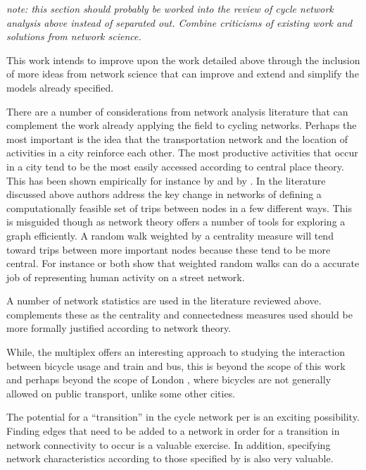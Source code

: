 \documentclass[11pt]{article} %
\begin{document}
\textit{note: this section should probably be worked into the review of cycle network analysis above instead of separated out. Combine criticisms of existing work and solutions from network science.}

This work intends to improve upon the work detailed above through the inclusion of more ideas from network science that can improve and extend and simplify the models already specified. 

There are a number of considerations from network analysis literature that can complement the work already applying the field to cycling networks. Perhaps the most important is the idea that the transportation network and the location of activities in a city reinforce each other. The most productive activities that occur in a city tend to be the most easily accessed according to central place theory. This has been shown empirically for instance by \cite{porta2012street} and by \cite{wang2011street}. In the literature discussed above authors address the key change in networks of defining a computationally feasible set of trips between nodes in a few different ways. This is misguided though as network theory offers a number of tools for exploring a graph efficiently. A random walk weighted by a centrality measure will tend toward trips between more important nodes because these tend to be more central. For instance \cite{Jiang2009characterizing} or  \cite{volchenkov2007random} both show that weighted random walks can do a accurate job of representing human activity on a street network. 

A number of network statistics are used in the literature reviewed above. \cite{crucitti2006centrality} complements these as the centrality and connectedness measures used should be more formally justified according to network theory. 

While, the multiplex offers an interesting approach to studying the interaction between bicycle usage and train and bus, this is beyond the scope of this work and perhaps beyond the scope of London , where bicycles are not generally allowed on public transport, unlike some other cities. 

The potential for a ``transition'' in the cycle network per \cite{barthelemy2018transitions} is an exciting possibility. Finding edges that need to be added to a network in order for a transition in network connectivity to occur is a valuable exercise. In addition, specifying network characteristics according to those specified by \cite{barthelemy2011spatial} is also very valuable. 
\end{document}
